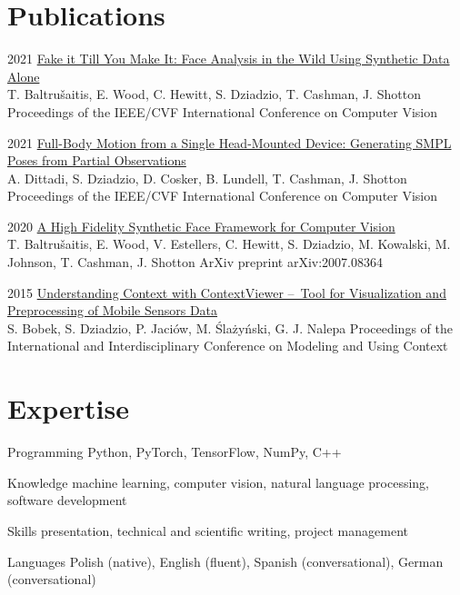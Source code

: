 \documentclass[]{friggeri-cv_osx}
\begin{document}
\section{Publications}
\begin{entrylist}
\entry
{2021}
{\href{https://scholar.google.com/citations?user=8vAIQXoAAAAJ&hl=en}{Fake it Till You Make It: Face Analysis in the Wild Using Synthetic Data Alone\\}}
{T. Baltru\v{s}aitis, E. Wood, C. Hewitt, S. Dziadzio, T. Cashman, J. Shotton}
{Proceedings of the IEEE/CVF International Conference on Computer Vision\\}

\entry
{2021}
{\href{https://scholar.google.com/citations?user=8vAIQXoAAAAJ&hl=en}{Full-Body Motion from a Single Head-Mounted Device: Generating SMPL Poses from Partial Observations\\}}
{A. Dittadi, S. Dziadzio, D. Cosker, B. Lundell, T. Cashman, J. Shotton}
{Proceedings of the IEEE/CVF International Conference on Computer Vision\\}

\entry
{2020}
{\href{https://scholar.google.com/citations?user=8vAIQXoAAAAJ&hl=en}{A High Fidelity Synthetic Face Framework for Computer Vision\\}}
{T. Baltru\v{s}aitis, E. Wood, V. Estellers, C. Hewitt, S. Dziadzio, M. Kowalski, M. Johnson, T. Cashman, J. Shotton}
{ArXiv preprint arXiv:2007.08364\\}

\entry
{2015}
{\href{https://scholar.google.com/citations?user=8vAIQXoAAAAJ&hl=en}{Understanding Context with ContextViewer – Tool for Visualization and Preprocessing of Mobile Sensors Data\\}}
{S. Bobek, S. Dziadzio, P. Jaciów, M. Ślażyński, G. J. Nalepa}
{Proceedings of the International and Interdisciplinary Conference on Modeling and Using Context\\}
\end{entrylist}

\section{Expertise}
\begin{entrylist}
\entry
{}
{Programming}
{}
{Python, PyTorch, TensorFlow, NumPy, C++}

\entry
{}
{Knowledge}
{}
{machine learning, computer vision, natural language processing, software development}

\entry
{}
{Skills}
{}
{presentation, technical and scientific writing, project management}

\entry
{}
{Languages}
{}
{Polish (native), English (fluent), Spanish (conversational), German (conversational)}
\end{entrylist}
\end{document}
